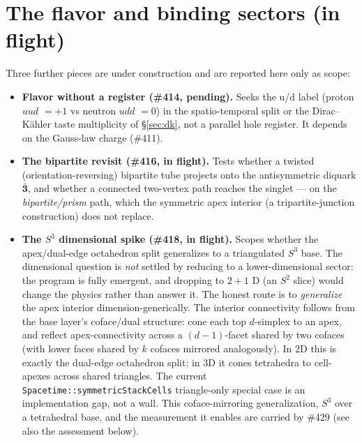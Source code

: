\documentclass[11pt]{article}
\newcommand{\rep}[1]{\mathbf{#1}}
\begin{document}
\section{The flavor and binding sectors (in flight)}
\label{sec:flight}
Three further pieces are under construction and are reported here only as scope:
\begin{itemize}[nosep]
  \item \textbf{Flavor without a register (\#414, pending).} Seeks the u/d label
  (proton $uud$ $=+1$ vs neutron $udd$ $=0$) in the spatio-temporal split or the
  Dirac--K\"ahler taste multiplicity of \S\ref{sec:dk}, not a parallel hole register. It
  depends on the Gauss-law charge (\#411).
  \item \textbf{The bipartite revisit (\#416, in flight).} Tests whether a twisted
  (orientation-reversing) bipartite tube projects onto the antisymmetric diquark
  $\bar{\rep3}$, and whether a connected two-vertex path reaches the singlet --- on the
  \emph{bipartite/prism} path, which the symmetric apex interior (a tripartite-junction
  construction) does not replace.
  \item \textbf{The $S^3$ dimensional spike (\#418, in flight).} Scopes whether the
  apex/dual-edge octahedron split generalizes to a triangulated $S^3$ base. The
  dimensional question is \emph{not} settled by reducing to a lower-dimensional sector:
  the program is fully emergent, and dropping to $2+1$ D (an $S^2$ slice) would change the
  physics rather than answer it. The honest route is to \emph{generalize} the apex
  interior dimension-generically. The interior connectivity follows from the base layer's
  coface/dual structure: cone each top $d$-simplex to an apex, and reflect apex-connectivity
  across a $(d-1)$-facet shared by two cofaces (with lower faces shared by $k$ cofaces
  mirrored analogously). In $2$D this is exactly the dual-edge octahedron split; in $3$D it
  cones tetrahedra to cell-apexes across shared triangles. The current
  \texttt{Spacetime::symmetricStackCells} triangle-only special case is an implementation
  gap, not a wall. This coface-mirroring generalization, $S^3$ over a tetrahedral base, and
  the measurement it enables are carried by \#429 (see also the assessment below).
\end{itemize}
\end{document}
